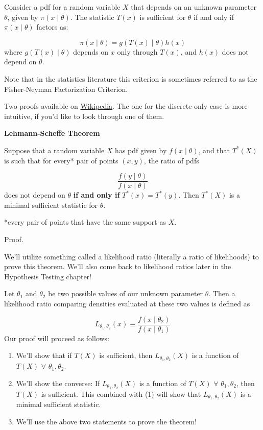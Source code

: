 \documentclass[
  letterpaper,
  DIV=11,
  numbers=noendperiod]{scrreprt}
\begin{document}
Consider a pdf for a random variable \(X\) that depends on an unknown
parameter \(\theta\), given by \(\pi(x \mid \theta)\). The statistic
\(T(x)\) is sufficient for \(\theta\) if and only if
\(\pi(x \mid \theta)\) factors as:

\[
\pi(x \mid \theta) = g(T(x) \mid \theta) h(x)
\] where \(g(T(x) \mid \theta)\) depends on \(x\) only through \(T(x)\),
and \(h(x)\) does not depend on \(\theta\).

Note that in the statistics literature this criterion is sometimes
referred to as the Fisher-Neyman Factorization Criterion.

Two proofs available on
\href{https://en.wikipedia.org/wiki/Sufficient_statistic\#Proof}{Wikipedia}.
The one for the discrete-only case is more intuitive, if you'd like to
look through one of them.

\textbf{Lehmann-Scheffe Theorem}

Suppose that a random variable \(X\) has pdf given by
\(f(x \mid \theta)\), and that \(T^*(X)\) is such that for every* pair
of points \((x,y)\), the ratio of pdfs

\[
\frac{f(y \mid \theta)}{f(x \mid \theta)}
\] does not depend on \(\theta\) \textbf{if and only if}
\(T^*(x) = T^*(y)\). Then \(T^*(X)\) is a minimal sufficient statistic
for \(\theta\).

*every pair of points that have the same support as \(X\).

Proof.

We'll utilize something called a likelihood ratio (literally a ratio of
likelihoods) to prove this theorem. We'll also come back to likelihood
ratios later in the Hypothesis Testing chapter!

Let \(\theta_1\) and \(\theta_2\) be two possible values of our unknown
parameter \(\theta\). Then a likelihood ratio comparing densities
evaluated at these two values is defined as

\[
L_{\theta_1, \theta_2}(x) \equiv \frac{f(x \mid \theta_2)}{f(x \mid \theta_1)}
\] Our proof will proceed as follows:

\begin{enumerate}
\def\labelenumi{\arabic{enumi}.}
\item
  We'll show that if \(T(X)\) is sufficient, then
  \(L_{\theta_1, \theta_2}(X)\) is a function of \(T(X)\) \(\forall\)
  \(\theta_1, \theta_2\).
\item
  We'll show the converse: If \(L_{\theta_1, \theta_2}(X)\) is a
  function of \(T(X)\) \(\forall\) \(\theta_1, \theta_2\), then \(T(X)\)
  is sufficient. This combined with (1) will show that
  \(L_{\theta_1, \theta_2}(X)\) is a minimal sufficient statistic.
\item
  We'll use the above two statements to prove the theorem!
\end{enumerate}
\end{document}

